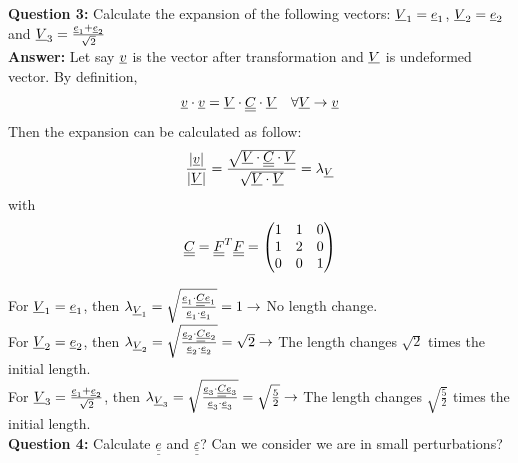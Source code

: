 \documentclass[letter,12pt]{article}
\newcommand{\TT}[1]{\underline{\underline{#1}}}
\newcommand{\T}[1]{\underline{#1}}
\begin{document}
	\noindent \textbf{Question 3:} Calculate the expansion of the following vectors: $\Vu_1 =  \T{e}_1$, $ \Vu_2 = \T{e}_2$ and $\Vu_3 =  \frac{\T{e}_1+\T{e}_2}{\sqrt{2}}$ \\
	
	\textbf{Answer:} Let say $\underline{v}$ is the vector after transformation and $\underline{V}$ is undeformed vector. By definition,
	\begin{equation}
	\underline{v} \cdot \underline{v} = \underline{V} \cdot \underline{\underline{C}} \cdot \underline{V} \quad \forall \underline{V} \rightarrow \underline{v}
	\end{equation}
	Then the expansion can be calculated as follow:
	\begin{equation}
	\frac{|\underline{v}|}{|\underline{V}|} = \frac{\sqrt{\underline{V} \cdot \underline{\underline{C}} \cdot \underline{V}}}{\sqrt{\underline{V} \cdot \underline{V}}} = \lambda_{\underline{V}}
	\end{equation}
	with
	\begin{equation}
	\underline{\underline{C}} = \underline{\underline{F}}^T \underline{\underline{F}} = \left( \begin{matrix}
	1 & 1 & 0 \\
	1 & 2 & 0 \\
	0 & 0 & 1
	\end{matrix} \right)
	\end{equation}
	
	For $\underline{V}_1 = \underline{e}_1$, then $\lambda_{\underline{V}_1} = \sqrt{\frac{\underline{e}_1 \cdot \underline{\underline{C}} \underline{e}_1}{\underline{e}_1 \cdot \underline{e}_1}} = 1 \rightarrow $ No length change. \\
	
	For $\underline{V}_2 = \underline{e}_2$, then $\lambda_{\underline{V}_2} = \sqrt{\frac{\underline{e}_2 \cdot \underline{\underline{C}} \underline{e}_2}{\underline{e}_2 \cdot \underline{e}_2}} = \sqrt{2} \rightarrow $ The length changes $\sqrt{2}$ times the initial length. \\
	
	For $\Vu_3 = \frac{\T{e}_1+\T{e}_2}{\sqrt{2}}$, then $\lambda_{\underline{V}_3} = \sqrt{\frac{\underline{e}_3 \cdot \underline{\underline{C}} \underline{e}_3}{\underline{e}_3 \cdot \underline{e}_3}} = \sqrt{\frac{5}{2}} \rightarrow $ The length changes $\sqrt{\frac{5}{2}}$ times the initial length. \\
	
	\noindent \textbf{Question 4:} Calculate $\TT{e}$ and $\TT{\varepsilon}$? Can we consider we are in small perturbations? \\
	
\end{document}
